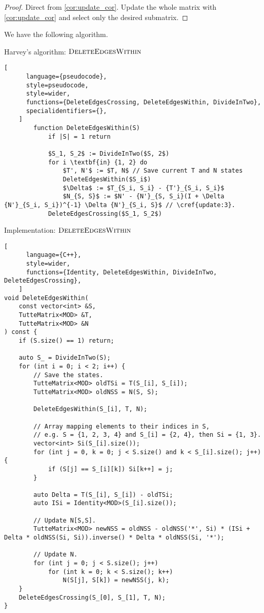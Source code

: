 \begin{proof}
    Direct from \cref{cor:update_cor}. Update the whole matrix with \ref{cor:update_cor} and select only the desired submatrix.
\end{proof}

We have the following algorithm.

\begin{programruledcaption}{Harvey's algorithm: \(\textsc{DeleteEdgesWithin}\)}
    \begin{lstlisting}[
      language={pseudocode},
      style=pseudocode,
      style=wider,
      functions={DeleteEdgesCrossing, DeleteEdgesWithin, DivideInTwo},
      specialidentifiers={},
    ]
        function DeleteEdgesWithin(S)
            if |S| = 1 return

            $S_1, S_2$ := DivideInTwo($S, 2$)
            for i \textbf{in} {1, 2} do
                $T', N'$ := $T, N$ // Save current T and N states
                DeleteEdgesWithin($S_i$)
                $\Delta$ := $T_{S_i, S_i} - {T'}_{S_i, S_i}$
                $N_{S, S}$ := $N' - {N'}_{S, S_i}(I + \Delta {N'}_{S_i, S_i})^{-1} \Delta {N'}_{S_i, S}$ // \cref{update:3}. 
            DeleteEdgesCrossing($S_1, S_2$)
    \end{lstlisting}
\end{programruledcaption}

\begin{programruledcaption}{Implementation: \(\textsc{DeleteEdgesWithin}\)}
    \begin{lstlisting}[
      language={C++},
      style=wider,
      functions={Identity, DeleteEdgesWithin, DivideInTwo, DeleteEdgesCrossing},
    ]
void DeleteEdgesWithin(
    const vector<int> &S, 
    TutteMatrix<MOD> &T, 
    TutteMatrix<MOD> &N
) const {
    if (S.size() == 1) return;

    auto S_ = DivideInTwo(S);
    for (int i = 0; i < 2; i++) {
        // Save the states.
        TutteMatrix<MOD> oldTSi = T(S_[i], S_[i]);
        TutteMatrix<MOD> oldNSS = N(S, S);

        DeleteEdgesWithin(S_[i], T, N);

        // Array mapping elements to their indices in S,
        // e.g. S = {1, 2, 3, 4} and S_[i] = {2, 4}, then Si = {1, 3}.
        vector<int> Si(S_[i].size());
        for (int j = 0, k = 0; j < S.size() and k < S_[i].size(); j++) {
            if (S[j] == S_[i][k]) Si[k++] = j;
        }

        auto Delta = T(S_[i], S_[i]) - oldTSi;
        auto ISi = Identity<MOD>(S_[i].size());

        // Update N[S,S].
        TutteMatrix<MOD> newNSS = oldNSS - oldNSS('*', Si) * (ISi + Delta * oldNSS(Si, Si)).inverse() * Delta * oldNSS(Si, '*');

        // Update N.
        for (int j = 0; j < S.size(); j++)
            for (int k = 0; k < S.size(); k++)
                N(S[j], S[k]) = newNSS(j, k);
    }
    DeleteEdgesCrossing(S_[0], S_[1], T, N);
}
    \end{lstlisting}
\end{programruledcaption}

